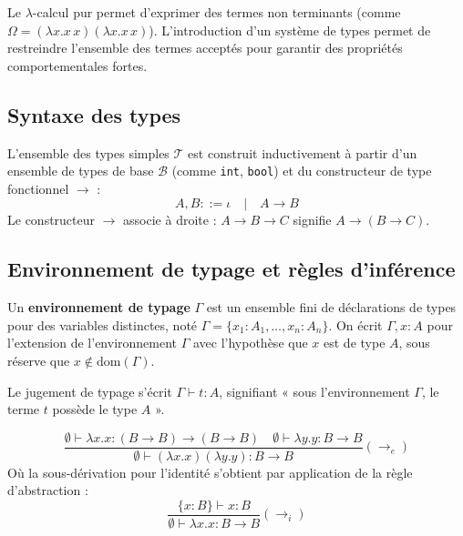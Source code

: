 \documentclass{article}
\begin{document}
Le $\lambda$-calcul pur permet d'exprimer des termes non terminants (comme $\Omega = (\lambda x. x\,x)(\lambda x. x\,x)$). L'introduction d'un système de types permet de restreindre l'ensemble des termes acceptés pour garantir des propriétés comportementales fortes.

\subsection{Syntaxe des types}

L'ensemble des types simples $\mathcal{T}$ est construit inductivement à partir d'un ensemble de types de base $\mathcal{B}$ (comme \texttt{int}, \texttt{bool}) et du constructeur de type fonctionnel $\to$ :
\[ A, B ::= \iota \quad | \quad A \to B \]
Le constructeur $\to$ associe à droite : $A \to B \to C$ signifie $A \to (B \to C)$.

\subsection{Environnement de typage et règles d'inférence}

Un \textbf{environnement de typage} $\Gamma$ est un ensemble fini de déclarations de types pour des variables distinctes, noté $\Gamma = \{x_1 : A_1, \dots, x_n : A_n\}$. On écrit $\Gamma, x : A$ pour l'extension de l'environnement $\Gamma$ avec l'hypothèse que $x$ est de type $A$, sous réserve que $x \notin \text{dom}(\Gamma)$.

Le jugement de typage s'écrit $\Gamma \vdash t : A$, signifiant « sous l'environnement $\Gamma$, le terme $t$ possède le type $A$ ».


\[
\frac{\emptyset \vdash \lambda x. x : (B \to B) \to (B \to B) \quad \emptyset \vdash \lambda y. y : B \to B}{\emptyset \vdash (\lambda x. x)(\lambda y. y) : B \to B} (\to_e)
\]
Où la sous-dérivation pour l'identité s'obtient par application de la règle d'abstraction :
\[
\frac{\{x : B\} \vdash x : B}{\emptyset \vdash \lambda x. x : B \to B} (\to_i)
\]
\end{document}
